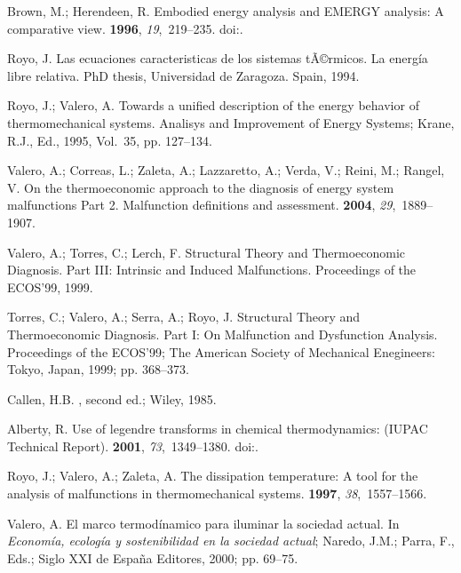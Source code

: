 \documentclass[energies,article,submit,moreauthors,pdftex]{Definitions/mdpi}
\begin{document}
\begin{thebibliography}{-------}
	Brown, M.; Herendeen, R.
	\newblock Embodied energy analysis and EMERGY analysis: A comparative view.
	 {\bf 1996}, {\em 19},~219--235.
	\newblock
	doi:{\href{https://doi.org/10.1016/S0921-8009(96)00046-8}{}}.

	Royo, J.
	\newblock Las ecuaciones caracteristicas de los sistemas tÃ©rmicos. {L}a
	energía libre relativa.
	\newblock PhD thesis, Universidad de Zaragoza. Spain,  1994.

	Royo, J.; Valero, A.
	\newblock Towards a unified description of the energy behavior of
	thermomechanical systems.
	\newblock  Analisys and Improvement of Energy Systems; Krane, R.J., Ed.,  1995,
	Vol.~35, pp. 127--134.

	Valero, A.; Correas, L.; Zaleta, A.; Lazzaretto, A.; Verda, V.; Reini, M.;
	Rangel, V.
	\newblock On the thermoeconomic approach to the diagnosis of energy system
	malfunctions Part 2. Malfunction definitions and assessment.
	 {\bf 2004}, {\em 29},~1889--1907.

	Valero, A.; Torres, C.; Lerch, F.
	\newblock Structural Theory and Thermoeconomic Diagnosis. Part III: Intrinsic
	and Induced Malfunctions.
	\newblock  Proceedings of the ECOS'99,  1999.

	Torres, C.; Valero, A.; Serra, A.; Royo, J.
	\newblock Structural Theory and Thermoeconomic Diagnosis. Part I: On
	Malfunction and Dysfunction Analysis.
	\newblock  Proceedings of the ECOS'99; The American Society of Mechanical
	Enegineers: Tokyo, Japan,  1999; pp. 368--373.

	Callen, H.B.
	,
	second ed.; Wiley,  1985.

	Alberty, R.
	\newblock Use of legendre transforms in chemical thermodynamics: (IUPAC
	Technical Report).
	 {\bf 2001}, {\em 73},~1349--1380.
	\newblock
	doi:{\href{https://doi.org/10.1351/pac200173081349}{}}.

	Royo, J.; Valero, A.; Zaleta, A.
	\newblock The dissipation temperature: A tool for the analysis of malfunctions
	in thermomechanical systems.
	 {\bf 1997}, {\em
		38},~1557--1566.

	Valero, A.
	\newblock El marco termodínamico para iluminar la sociedad actual. In {\em
		Economía, ecología y sostenibilidad en la sociedad actual}; Naredo, J.M.;
	Parra, F., Eds.; Siglo XXI de España Editores,  2000; pp. 69--75.
\end{thebibliography}
\end{document}
